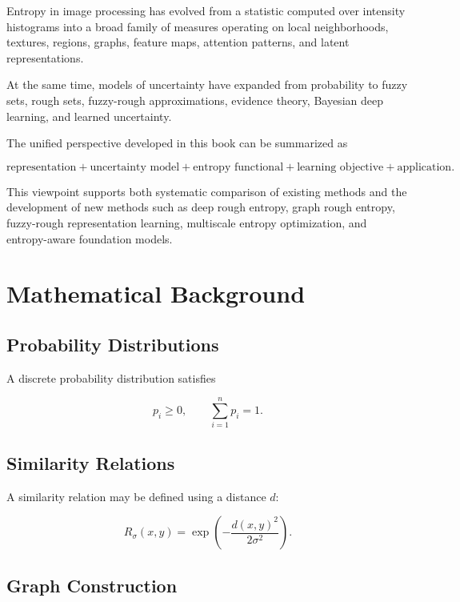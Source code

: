 \documentclass[11pt,oneside]{book}
\theoremstyle{remark}
\begin{document}
	Entropy in image processing has evolved from a statistic computed over
	intensity histograms into a broad family of measures operating on local
	neighborhoods, textures, regions, graphs, feature maps, attention patterns,
	and latent representations.
	
	At the same time, models of uncertainty have expanded from probability to
	fuzzy sets, rough sets, fuzzy-rough approximations, evidence theory, Bayesian
	deep learning, and learned uncertainty.
	
	The unified perspective developed in this book can be summarized as
	
	\[
	\boxed{
		\text{representation}
		+
		\text{uncertainty model}
		+
		\text{entropy functional}
		+
		\text{learning objective}
		+
		\text{application}.
	}
	\]
	
	This viewpoint supports both systematic comparison of existing methods and the
	development of new methods such as deep rough entropy, graph rough entropy,
	fuzzy-rough representation learning, multiscale entropy optimization, and
	entropy-aware foundation models.
	
	
	\appendix
	
	\chapter{Mathematical Background}
	\label{app:mathematical-background}
	
	\section{Probability Distributions}
	
	A discrete probability distribution satisfies
	
	\[
	p_i\geq0,
	\qquad
	\sum_{i=1}^{n}p_i=1.
	\]
	
	\section{Similarity Relations}
	
	A similarity relation may be defined using a distance \(d\):
	
	\[
	R_{\sigma}(x,y)
	=
	\exp
	\left(
	-\frac{d(x,y)^2}{2\sigma^2}
	\right).
	\]
	
	\section{Graph Construction}
	
\end{document}
